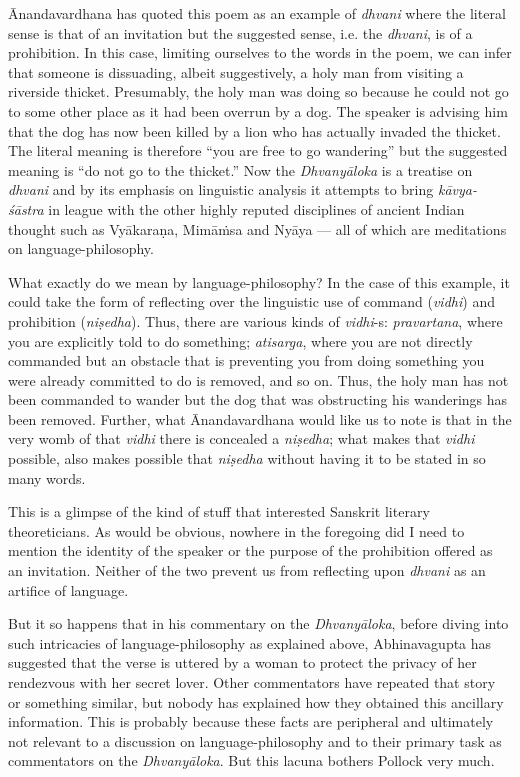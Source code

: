 Ānandavardhana has quoted this poem as an example of \textsl{dhvani} where the literal sense is that of an invitation but the suggested sense, i.e. the \textsl{dhvani}, is of a prohibition. In this case, limiting ourselves to the words in the poem, we can infer that someone is dissuading, albeit suggestively, a holy man from visiting a riverside thicket. Presumably, the holy man was doing so because he could not go to some other place as it had been overrun by a dog. The speaker is advising him that the dog has now been killed by a lion who has actually invaded the thicket. The literal meaning is therefore ``you are free to go wandering'' but the suggested meaning is ``do not go to the thicket.'' Now the \textsl{Dhvanyāloka} is a treatise on \textsl{dhvani} and by its emphasis on linguistic analysis it attempts to bring \textsl{kāvya-śāstra} in league with the other highly reputed disciplines of ancient Indian thought such as Vyākaraṇa, Mimāṁsa and Nyāya --- all of which are meditations on language-philosophy.

What exactly do we mean by language-philosophy? In the case of this example, it could take the form of reflecting over the linguistic use of command (\textsl{vidhi}) and prohibition (\textsl{niṣedha}). Thus, there are various kinds of \textsl{vidhi}-s: \textsl{pravartana}, where you are explicitly told to do something; \textsl{atisarga}, where you are not directly commanded but an obstacle that is preventing you from doing something you were already committed to do is removed, and so on. Thus, the holy man has not been commanded to wander but the dog that was obstructing his wanderings has been removed. Further, what Ānandavardhana would like us to note is that in the very womb of that \textsl{vidhi} there is concealed a \textsl{niṣedha}; what makes that \textsl{vidhi} possible, also makes possible that \textsl{niṣedha} without having it to be stated in so many words.

This is a glimpse of the kind of stuff that interested Sanskrit literary theoreticians. As would be obvious, nowhere in the foregoing did I need to mention the identity of the speaker or the purpose of the prohibition offered as an invitation. Neither of the two prevent us from reflecting upon \textsl{dhvani} as an artifice of language. 

But it so happens that in his commentary on the \textsl{Dhvanyāloka}, before diving into such intricacies of language-philosophy as explained above, Abhinavagupta has suggested that the verse is uttered by a woman to protect the privacy of her rendezvous with her secret lover. Other commentators have repeated that story or something similar, but nobody has explained how they obtained this ancillary information. This is probably because these facts are peripheral and ultimately not relevant to a discussion on language-philosophy and to their primary task as commentators on the \textsl{Dhvanyāloka}. But this lacuna bothers Pollock very much.
\vskip 2pt


